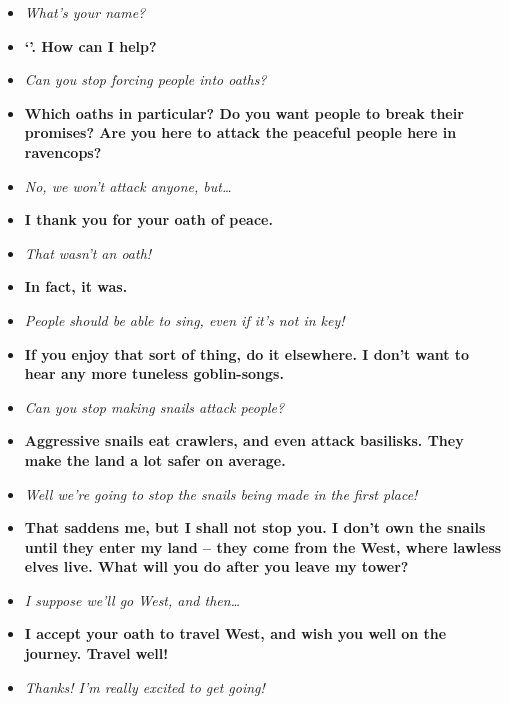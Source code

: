 \begin{multicols}{2}
\pagebreak
\begin{itemize}
  \item\it
  What's your name?
  \item[\adforn{54}]\bf
  `'.
  How can I help?
  \item\it
  Can you stop forcing people into oaths?
  \item[\adforn{54}]\bf
  Which oaths in particular?
  Do you want people to break their promises?
  Are you here to attack the peaceful people here in \gls{ravencops}?
  \item\it
  No, we won't attack anyone, but\ldots
  \item[\adforn{54}]\bf
  I thank you for your oath of peace.
  \item\it
  That wasn't an oath!
  \item[\adforn{54}]\bf
  In fact, it was.
  \item\it
  People should be able to sing, even if it's not in key!
  \item[\adforn{54}]\bf
  If you enjoy that sort of thing, do it elsewhere.
  I don't want to hear any more tuneless goblin-songs.
  \item\it
  Can you stop making snails attack people?
  \item[\adforn{54}]\bf
  Aggressive snails eat \glspl{crawler}, and even attack \glspl{basilisk}.
  They make the land a lot safer on average.
  \item\it
  Well we're going to stop the snails being made in the first place!
  \item[\adforn{54}]\bf
  That saddens me, but I shall not stop you.
  I don't own the snails until they enter my land -- they come from the West, where lawless elves live.
  What will you do after you leave my tower?
  \item\it
  I suppose we'll go West, and then\ldots
  \item[\adforn{54}]\bf
  I accept your oath to travel West, and wish you well on the journey.
  Travel well!
  \item\it
  Thanks!
  I'm really excited to get going!
\end{itemize}

\MindElder

\showStdSpells[
  
  
  
  
]

\label{oathlessLovers}


\end{multicols}
